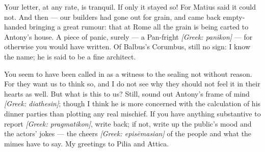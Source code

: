 

 Your letter, at any rate, is tranquil. If only it stayed so! For Matius said it could not. And then --- our builders had gone out for grain, and came back empty-handed bringing a great rumour: that at Rome all the grain is being carted to Antony's house. A piece of panic, surely --- a Pan-fright \textit{[Greek: panikon]} --- for otherwise you would have written. Of Balbus's Corumbus, still no sign: I know the name; he is said to be a fine architect.

 You seem to have been called in as a witness to the sealing not without reason. For they want us to think so, and I do not see why they should not feel it in their hearts as well. But what is this to us? Still, sound out Antony's frame of mind \textit{[Greek: diathesin]}; though I think he is more concerned with the calculation of his dinner parties than plotting any real mischief. If you have anything substantive to report \textit{[Greek: pragmatikon]}, write back; if not, write up the public's mood and the actors' jokes --- the cheers \textit{[Greek: episēmasian]} of the people and what the mimes have to say. My greetings to Pilia and Attica.
